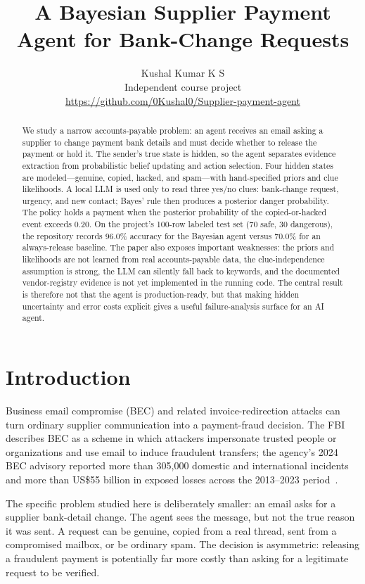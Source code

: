 \documentclass{article}
\title{A Bayesian Supplier Payment Agent for Bank-Change Requests}
\author{
Kushal Kumar K S\\
\affiliations
Independent course project\\
\emails
\url{https://github.com/0Kushal0/Supplier-payment-agent}
}
\begin{document}
\maketitle

\begin{abstract}
We study a narrow accounts-payable problem: an agent receives an email asking a supplier to change payment bank details and must decide whether to release the payment or hold it. The sender's true state is hidden, so the agent separates evidence extraction from probabilistic belief updating and action selection. Four hidden states are modeled---genuine, copied, hacked, and spam---with hand-specified priors and clue likelihoods. A local LLM is used only to read three yes/no clues: bank-change request, urgency, and new contact; Bayes' rule then produces a posterior danger probability. The policy holds a payment when the posterior probability of the copied-or-hacked event exceeds 0.20. On the project's 100-row labeled test set (70 safe, 30 dangerous), the repository records 96.0\% accuracy for the Bayesian agent versus 70.0\% for an always-release baseline. The paper also exposes important weaknesses: the priors and likelihoods are not learned from real accounts-payable data, the clue-independence assumption is strong, the LLM can silently fall back to keywords, and the documented vendor-registry evidence is not yet implemented in the running code. The central result is therefore not that the agent is production-ready, but that making hidden uncertainty and error costs explicit gives a useful failure-analysis surface for an AI agent.
\end{abstract}

\section{Introduction}

Business email compromise (BEC) and related invoice-redirection attacks can turn ordinary supplier communication into a payment-fraud decision. The FBI describes BEC as a scheme in which attackers impersonate trusted people or organizations and use email to induce fraudulent transfers; the agency's 2024 BEC advisory reported more than 305{,}000 domestic and international incidents and more than US\$55 billion in exposed losses across the 2013--2023 period~\cite{fbi2024}.

The specific problem studied here is deliberately smaller: an email asks for a supplier bank-detail change. The agent sees the message, but not the true reason it was sent. A request can be genuine, copied from a real thread, sent from a compromised mailbox, or be ordinary spam. The decision is asymmetric: releasing a fraudulent payment is potentially far more costly than asking for a legitimate request to be verified.
\end{document}
